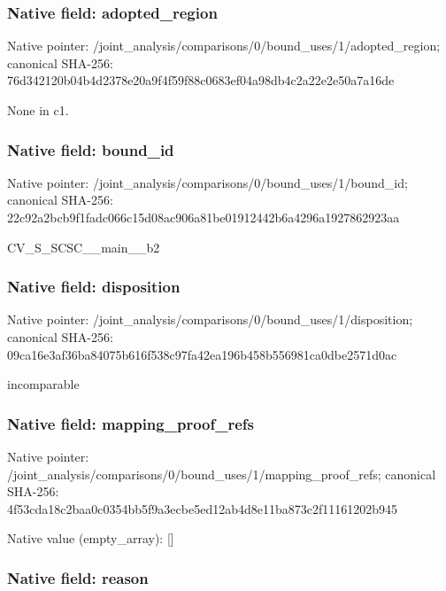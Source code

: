 \documentclass[10pt,a4paper]{article}
\begin{document}
\subsubsection{Native field: adopted\_region}


Native pointer: /joint\_analysis/comparis\allowbreak{}ons/0/bound\_uses/1/adopt\allowbreak{}ed\_region; canonical SHA-256: 76d342120b04b4d2378e20a9\allowbreak{}f4f59f88c0683ef04a98db4c\allowbreak{}2a22e2e50a7a16de


None in c1.


\subsubsection{Native field: bound\_id}


Native pointer: /joint\_analysis/comparis\allowbreak{}ons/0/bound\_uses/1/bound\allowbreak{}\_id; canonical SHA-256: 22c92a2bcb9f1fadc066c15d\allowbreak{}08ac906a81be01912442b6a4\allowbreak{}296a1927862923aa


CV\_S\_SCSC\_\_main\_\_b2


\subsubsection{Native field: disposition}


Native pointer: /joint\_analysis/comparis\allowbreak{}ons/0/bound\_uses/1/dispo\allowbreak{}sition; canonical SHA-256: 09ca16e3af36ba84075b616f\allowbreak{}538c97fa42ea196b458b5569\allowbreak{}81ca0dbe2571d0ac


incomparable


\subsubsection{Native field: mapping\_proof\_refs}


Native pointer: /joint\_analysis/comparis\allowbreak{}ons/0/bound\_uses/1/mappi\allowbreak{}ng\_proof\_refs; canonical SHA-256: 4f53cda18c2baa0c0354bb5f\allowbreak{}9a3ecbe5ed12ab4d8e11ba87\allowbreak{}3c2f11161202b945



Native value (empty\_array): []



\subsubsection{Native field: reason}
\end{document}
